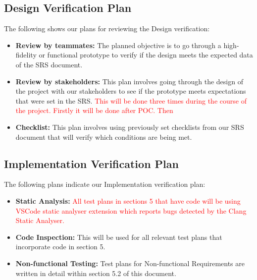 \documentclass[12pt, titlepage]{article}
\begin{document}
\subsection{Design Verification Plan}

The following shows our plans for reviewing the Design verification:
\begin{itemize}
    \item \textbf{Review by teammates:} The planned objective is to go through a high-fidelity or functional prototype to verify if the design meets the expected data of the SRS document.
    \item \textbf{Review by stakeholders:} This plan involves going through the design of the project with our stakeholders to see if the prototype meets expectations that were set in the SRS. \textcolor{red}{This will be done three times during the course of the project. Firstly it will be done after POC. Then }
    \item \textbf{Checklist:} This plan involves using previously set checklists from our SRS document that will verify which conditions are being met.
\end{itemize}

\subsection{Implementation Verification Plan}
The following plans indicate our Implementation verification plan:
\begin{itemize}
    \item \textbf{Static Analysis:} \textcolor{red}{ All test plans in sections 5 that have code will be using VSCode static analyser extension which reports bugs detected by the Clang Static Analyser.}
    \item \textbf{Code Inspection:} This will be used for all relevant test plans that incorporate code in section 5.
    \item \textbf{Non-functional Testing:} Test plans for Non-functional Requirements are written in detail within section 5.2 of this document.
\end{itemize}
\end{document}
